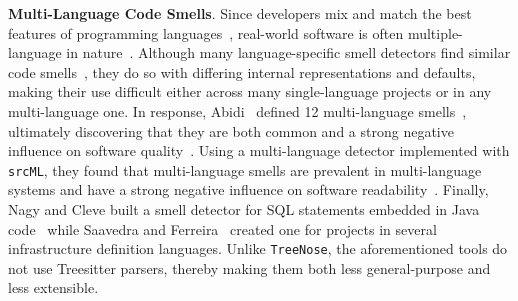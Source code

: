 
{\bf Multi-Language Code Smells}.
%
Since developers mix and match the best features of programming
languages~\cite{7476675}, real-world software is often multiple-language in
nature~\cite{723183}.
%
Although many language-specific smell detectors find similar code
smells~\cite{CheckStyle,PMD,Pysmell,Jscent,DesigniteJava}, they do so with
differing internal representations and defaults, making their use difficult
either across many single-language projects or in any multi-language one.
%
In response, Abidi~\etal{} defined 12 multi-language
smells~\cite{MultiLanguageCodeSmells}, ultimately discovering that they are
both common and a strong negative influence on software quality~\cite{Abidi2}.
%
Using a multi-language detector implemented with \texttt{srcML}, they found
that multi-language smells are prevalent in multi-language systems and have a
strong negative influence on software readability~\cite{Fault-Prone}.
%
Finally, Nagy and Cleve built a smell detector for SQL statements embedded in
Java code~\cite{SQLInJava} while Saavedra and Ferreira~\cite{Saavedra2023}
created one for projects in several infrastructure definition languages.
%
Unlike \texttt{TreeNose}, the aforementioned tools do not use Treesitter
parsers, thereby making them both less general-purpose and less extensible.
